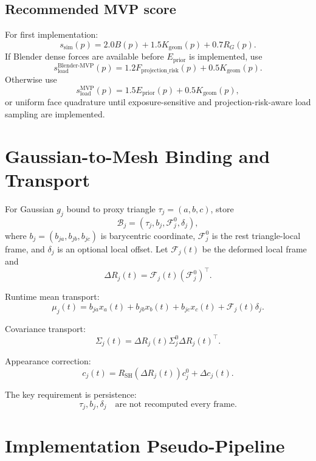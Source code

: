 \documentclass[11pt,a4paper]{article}
\begin{document}
\subsection{Recommended MVP score}

For first implementation:
\[
s_{\mathrm{sim}}(p)=2.0B(p)+1.5K_{\mathrm{geom}}(p)+0.7R_G(p).
\]
If Blender dense forces are available before $E_{\mathrm{prior}}$ is implemented, use
\[
s_{\mathrm{load}}^{\mathrm{Blender\text{-}MVP}}(p)=1.2F_{\mathrm{projection\_risk}}(p)+0.5K_{\mathrm{geom}}(p).
\]
Otherwise use
\[
s_{\mathrm{load}}^{\mathrm{MVP}}(p)=1.5E_{\mathrm{prior}}(p)+0.5K_{\mathrm{geom}}(p),
\]
or uniform face quadrature until exposure-sensitive and projection-risk-aware load sampling are implemented.

\section{Gaussian-to-Mesh Binding and Transport}

For Gaussian $g_j$ bound to proxy triangle $\tau_j=(a,b,c)$, store
\[
\mathcal{B}_j=(\tau_j,b_j,\mathcal{F}_j^0,\delta_j),
\]
where $b_j=(b_{ja},b_{jb},b_{jc})$ is barycentric coordinate, $\mathcal{F}_j^0$ is the rest triangle-local frame, and $\delta_j$ is an optional local offset. Let $\mathcal{F}_j(t)$ be the deformed local frame and
\[
\Delta R_j(t)=\mathcal{F}_j(t)(\mathcal{F}_j^0)^\top .
\]

Runtime mean transport:
\[
\mu_j(t)=b_{ja}x_a(t)+b_{jb}x_b(t)+b_{jc}x_c(t)+\mathcal{F}_j(t)\delta_j.
\]

Covariance transport:
\[
\Sigma_j(t)=\Delta R_j(t)\Sigma_j^0\Delta R_j(t)^\top.
\]

Appearance correction:
\[
c_j(t)=R_{\mathrm{SH}}(\Delta R_j(t))c_j^0+\Delta c_j(t).
\]

The key requirement is persistence:
\[
\tau_j,b_j,\delta_j\quad\text{are not recomputed every frame.}
\]

\section{Implementation Pseudo-Pipeline}
\end{document}
